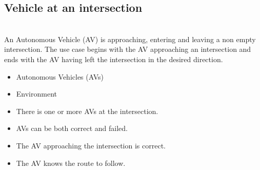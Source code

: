 \documentclass{memoir}
\begin{document}
\subsection{Vehicle at an intersection}
\begin{description}
	\addtolength{\itemindent}{0.5cm}
	\item[Brief Description] \hfill \\
	An Autonomous Vehicle (AV) is approaching, entering and leaving a non empty intersection. The use case begins with the AV approaching an intersection and ends with the AV having left the intersection in the desired direction. 
	
	\item[Actors] \hfill
	\begin{itemize}
		\item Autonomous Vehicles (AVs)
		\item Environment
	\end{itemize}
	
	\item[Preconditions] \hfill
	\begin{itemize}
		\item There is one or more AVs at the intersection. 
		\item AVs can be both correct and failed.
		\item The AV approaching the intersection is correct.
		\item The AV knows the route to follow.
	\end{itemize}
	

\end{description}
\end{document}
